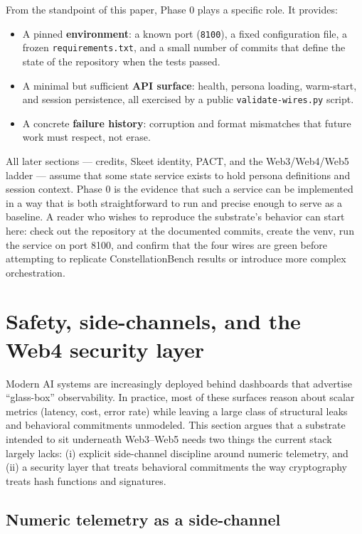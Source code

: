\documentclass{article}
\providecommand{\tightlist}{\setlength{\itemsep}{0pt}\setlength{\parskip}{0pt}}
\begin{document}
From the standpoint of this paper, Phase 0 plays a specific role. It
provides:

\begin{itemize}
\tightlist
\item
  A pinned \textbf{environment}: a known port (\texttt{8100}), a fixed
  configuration file, a frozen \texttt{requirements.txt}, and a small
  number of commits that define the state of the repository when the
  tests passed.
\item
  A minimal but sufficient \textbf{API surface}: health, persona
  loading, warm-start, and session persistence, all exercised by a
  public \texttt{validate-wires.py} script.
\item
  A concrete \textbf{failure history}: corruption and format mismatches
  that future work must respect, not erase.
\end{itemize}

All later sections --- credits, Skeet identity, PACT, and the
Web3/Web4/Web5 ladder --- assume that some state service exists to hold
persona definitions and session context. Phase 0 is the evidence that
such a service can be implemented in a way that is both straightforward
to run and precise enough to serve as a baseline. A reader who wishes to
reproduce the substrate's behavior can start here: check out the
repository at the documented commits, create the venv, run the service
on port 8100, and confirm that the four wires are green before
attempting to replicate ConstellationBench results or introduce more
complex orchestration.

\section{Safety, side-channels, and the Web4 security
layer}\label{safety-side-channels-and-the-web4-security-layer}

Modern AI systems are increasingly deployed behind dashboards that
advertise ``glass-box'' observability. In practice, most of these
surfaces reason about scalar metrics (latency, cost, error rate) while
leaving a large class of structural leaks and behavioral commitments
unmodeled. This section argues that a substrate intended to sit
underneath Web3--Web5 needs two things the current stack largely lacks:
(i) explicit side-channel discipline around numeric telemetry, and (ii)
a security layer that treats behavioral commitments the way cryptography
treats hash functions and signatures.

\subsection{Numeric telemetry as a
side-channel}\label{numeric-telemetry-as-a-side-channel}
\end{document}

